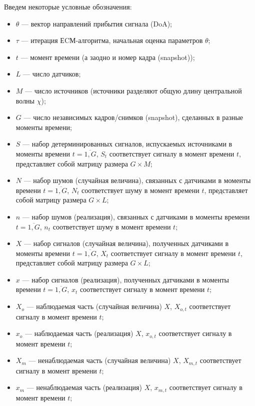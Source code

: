 \documentclass[11pt]{article}
\begin{document}
\begin{center}
\fontsize{20}{23}\selectfont {}
\end{center}
Введем некоторые условные обозначения:
\begin{itemize}
\item
$\theta$ --- вектор направлений прибытия сигнала (DoA);
\item
$\tau$ --- итерация ЕCМ-алгоритма, начальная оценка параметров $\theta$;
\item
$t$ --- момент времени (а заодно и номер кадра (snapshot));
\item
$L$ --- число датчиков;
\item
$M$ --- число источников (источники разделяют общую длину центральной волны $\chi$);
\item
$G$ --- число независимых кадров/снимков (snapshot), сделанных в разные моменты времени;
\item
$S$ --- набор детерминированных сигналов, испускаемых источниками в моменты времени $t=\overline{1,G}$, $S_t$ соответствует сигналу в момент времени $t$, представляет собой матрицу размера $G \times M$;
\item
$N$ --- набор шумов (случайная величина), связанных с датчиками в моменты времени $t=\overline{1,G}$, $N_t$ соответствует шуму в момент времени $t$, представляет собой матрицу размера $G \times L$;
\item
$n$ --- набор шумов (реализация), связанных с датчиками в моменты времени $t=\overline{1,G}$, $n_t$ соответствует шуму в момент времени $t$;
\item
$X$ --- набор сигналов (случайная величина), полученных датчиками в моменты времени $t=\overline{1,G}$, $X_t$ соответствует сигналу в момент времени $t$, представляет собой матрицу размера $G \times L$;
\item
$x$ --- набор сигналов (реализация), полученных датчиками в моменты времени $t=\overline{1,G}$, $x_t$ соответствует сигналу в момент времени $t$;
\item
$X_o$ --- наблюдаемая часть (случайная величина) $X$, $X_{o,t}$ соответствует сигналу в момент времени $t$; 
\item
$x_o$ --- наблюдаемая часть (реализация) $X$, $x_{o,t}$ соответствует сигналу в момент времени $t$;
\item
$X_m$ --- ненаблюдаемая часть (случайная величина) $X$, $X_{m,t}$ соответствует сигналу в момент времени $t$;
\item
$x_m$ --- ненаблюдаемая часть (реализация) $X$, $x_{m,t}$ соответствует сигналу в момент времени $t$;

\end{itemize}
\end{document}

